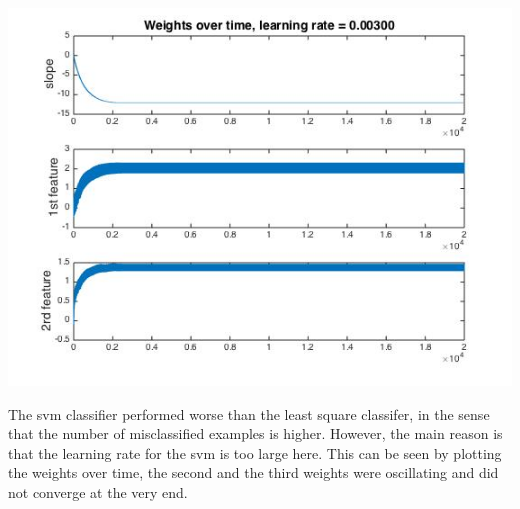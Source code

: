 \documentclass[paper=a4, fontsize=11pt]{scrartcl} %
\numberwithin{equation}{section} %
\numberwithin{figure}{section} %
\numberwithin{table}{section} %
\begin{document}
\begin{center}
\includegraphics[scale=.5]{hw7_4b_weights_532.jpg}
\end{center}

The svm classifier performed worse than the least square classifer, in the sense that the number of misclassified examples is higher. However, the main reason is that the learning rate for the svm is too large here. This can be seen by plotting the weights over time, the second and the third weights were oscillating and did not converge at the very end. 
\end{document}
